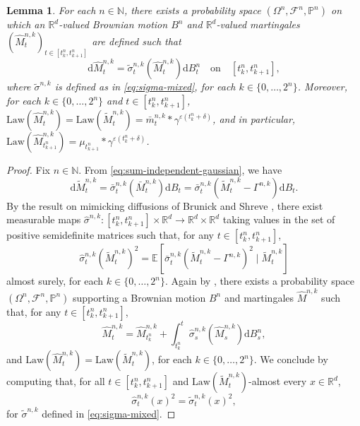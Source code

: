 \documentclass[12pt,oneside]{amsart}
\newtheorem{lemma}[theorem]{Lemma}
\theoremstyle{definition}
\newcommand{\F}{\mathcal F}
\newcommand{\Law}{\mathrm{Law}}
\newcommand{\D}{\mathrm{d}}
\newcommand{\N}{\mathbb N}
\newcommand{\R}{\mathbb R}
\def\P{{\mathbb P}}
\def\E{{\mathbb E}}
\def\R{{\mathbb R}}
\numberwithin{equation}{section}
\begin{document}
\begin{lemma}\label{lem:brunick-shreve}
	For each $n \in \N$, there exists a probability space $(\Omega^n, \F^n, \P^n)$ on which an $\R^d$-valued Brownian motion $B^n$ and $\R^d$-valued martingales $(\hat M^{n, k}_t)_{t \in [t^n_k, t^n_{k + 1}]}$ are defined such that
	\begin{equation}
		\D \hat{M}^{n, k}_t = \tilde{\sigma}^{n, k}_t(\hat{M}^{n, k}_t) \D B^n_t \quad \text{on} \quad [t^n_k, t^n_{k + 1}],
	\end{equation}
	where $\tilde \sigma^{n, k}$ is defined as in \eqref{eq:sigma-mixed}, for each $k \in \{0, \dotsc, 2^n\}$.
	Moreover, for each $k \in \{0, \dotsc, 2^n\}$ and $t \in [t^n_k, t^n_{k +1}]$, $\Law(\hat{M}^{n, k}_t) = \Law(\tilde{M}^{n, k}_t) = \bar{m}^{n, k}_{t} \ast \gamma^{\varepsilon(t^n_k + \delta)}$, and in particular, $\Law(\hat{M}^{n, k}_{t^n_{k + 1}}) = \mu_{t^n_{k +1}} \ast \gamma^{\varepsilon (t^n_k + \delta)}$.
\end{lemma}

\begin{proof}
	Fix $n \in \N$. From \eqref{eq:sum-independent-gaussian}, we have
	 \begin{equation}
	 	\D \tilde M^{n, k}_t = \bar \sigma^{n, k}_t(\bar M^{n, k}_t)\D B_t = \bar \sigma^{n, k}_t(\tilde M^{n, k}_t - \Gamma^{n,k})\D B_t.
	 \end{equation}
	 By the result on mimicking diffusions of Brunick and Shreve \cite[Corollary 3.7]{BrSh13}, there exist measurable maps $\hat \sigma^{n, k} \colon [t^n_k, t^n_{k + 1}] \times \R^d \to \R^d \times \R^d$ taking values in the set of positive semidefinite matrices such that, for any $t \in [t^n_k, t^n_{k + 1}]$,
	 \begin{equation}
	 	\hat \sigma^{n, k}_t(\tilde M^{n, k}_t)^2 = \E\!\left[\bar \sigma^{n, k}_t(\tilde M^{n, k}_t - \Gamma^{n,k})^2 \mid \tilde M^{n, k}_t\right]\!
	 \end{equation}
	 almost surely, for each $k \in \{0, \dotsc, 2^n\}$. Again by \cite[Corollary 3.7]{BrSh13}, there exists a probability space $(\Omega^n, \F^n, \P^n)$ supporting a Brownian motion $B^n$ and martingales $\hat M^{n,k}$ such that, for any $t \in [t^n_k, t^n_{k + 1}]$,
	 \begin{equation}
	 	\hat M^{n,k}_t = \hat M^{n,k}_{t^n_k} + \int_{t^n_k}^t \hat \sigma^{n, k}_s(\hat M^{n, k}_s) \D B^n_s,
	 \end{equation}
	 and $\Law(\hat M^{n, k}_t) = \Law(\tilde M^{n, k}_t)$, for each $k \in \{0, \dotsc, 2^n\}$. We conclude by computing that, for all $t \in [t^n_k, t^n_{k + 1}]$ and $\Law(\tilde M^{n,k}_t)$-almost every $x \in \R^d$,
	 \begin{equation}
	 	\hat \sigma^{n,k}_t(x)^2 = \tilde \sigma^{n, k}_t(x)^2,
	 \end{equation}
	 for $\tilde \sigma^{n,k}$ defined in \eqref{eq:sigma-mixed}.
\end{proof}
\end{document}
